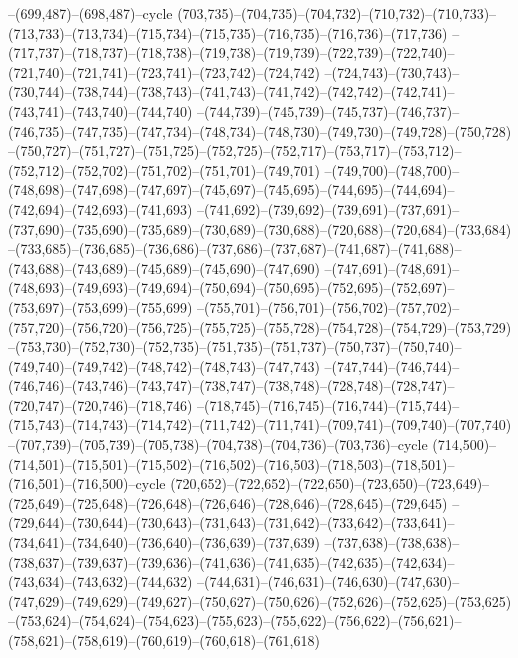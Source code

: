 --(699,487)--(698,487)--cycle
(703,735)--(704,735)--(704,732)--(710,732)--(710,733)--(713,733)--(713,734)--(715,734)--(715,735)--(716,735)--(716,736)--(717,736)
--(717,737)--(718,737)--(718,738)--(719,738)--(719,739)--(722,739)--(722,740)--(721,740)--(721,741)--(723,741)--(723,742)--(724,742)
--(724,743)--(730,743)--(730,744)--(738,744)--(738,743)--(741,743)--(741,742)--(742,742)--(742,741)--(743,741)--(743,740)--(744,740)
--(744,739)--(745,739)--(745,737)--(746,737)--(746,735)--(747,735)--(747,734)--(748,734)--(748,730)--(749,730)--(749,728)--(750,728)
--(750,727)--(751,727)--(751,725)--(752,725)--(752,717)--(753,717)--(753,712)--(752,712)--(752,702)--(751,702)--(751,701)--(749,701)
--(749,700)--(748,700)--(748,698)--(747,698)--(747,697)--(745,697)--(745,695)--(744,695)--(744,694)--(742,694)--(742,693)--(741,693)
--(741,692)--(739,692)--(739,691)--(737,691)--(737,690)--(735,690)--(735,689)--(730,689)--(730,688)--(720,688)--(720,684)--(733,684)
--(733,685)--(736,685)--(736,686)--(737,686)--(737,687)--(741,687)--(741,688)--(743,688)--(743,689)--(745,689)--(745,690)--(747,690)
--(747,691)--(748,691)--(748,693)--(749,693)--(749,694)--(750,694)--(750,695)--(752,695)--(752,697)--(753,697)--(753,699)--(755,699)
--(755,701)--(756,701)--(756,702)--(757,702)--(757,720)--(756,720)--(756,725)--(755,725)--(755,728)--(754,728)--(754,729)--(753,729)
--(753,730)--(752,730)--(752,735)--(751,735)--(751,737)--(750,737)--(750,740)--(749,740)--(749,742)--(748,742)--(748,743)--(747,743)
--(747,744)--(746,744)--(746,746)--(743,746)--(743,747)--(738,747)--(738,748)--(728,748)--(728,747)--(720,747)--(720,746)--(718,746)
--(718,745)--(716,745)--(716,744)--(715,744)--(715,743)--(714,743)--(714,742)--(711,742)--(711,741)--(709,741)--(709,740)--(707,740)
--(707,739)--(705,739)--(705,738)--(704,738)--(704,736)--(703,736)--cycle
(714,500)--(714,501)--(715,501)--(715,502)--(716,502)--(716,503)--(718,503)--(718,501)--(716,501)--(716,500)--cycle
(720,652)--(722,652)--(722,650)--(723,650)--(723,649)--(725,649)--(725,648)--(726,648)--(726,646)--(728,646)--(728,645)--(729,645)
--(729,644)--(730,644)--(730,643)--(731,643)--(731,642)--(733,642)--(733,641)--(734,641)--(734,640)--(736,640)--(736,639)--(737,639)
--(737,638)--(738,638)--(738,637)--(739,637)--(739,636)--(741,636)--(741,635)--(742,635)--(742,634)--(743,634)--(743,632)--(744,632)
--(744,631)--(746,631)--(746,630)--(747,630)--(747,629)--(749,629)--(749,627)--(750,627)--(750,626)--(752,626)--(752,625)--(753,625)
--(753,624)--(754,624)--(754,623)--(755,623)--(755,622)--(756,622)--(756,621)--(758,621)--(758,619)--(760,619)--(760,618)--(761,618)
